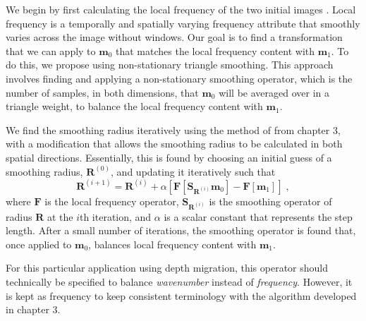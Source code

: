     We begin by first calculating the local frequency of the two initial images \cite[]{attr}. 
    Local frequency is a temporally and spatially varying frequency attribute that smoothly varies across the image without windows.
    Our goal is to find a transformation that we can apply to $\mathbf{m}_0$ that matches the local frequency content with $\mathbf{m}_1$. 
    To do this, we propose using non-stationary triangle smoothing. 
    This approach involves finding and applying a non-stationary smoothing operator, which is the number of samples, in both dimensions, that $\mathbf{m}_0$ will be averaged over in a triangle weight, to balance the local frequency content with $\mathbf{m}_1$. 
    
    We find the smoothing radius iteratively using the method of \cite{locfreq} from chapter 3, with a modification that allows the smoothing radius to be calculated in both spatial directions. 
Essentially, this is found by choosing an initial guess of a smoothing radius, $\mathbf{R}^{(0)}$, and updating it iteratively such that 
    \begin{equation}
        \label{eq:it}
        \mathbf{R}^{(i+1)} = \mathbf{R}^{(i)}+ \alpha \left [ \mathbf{F}[\mathbf{S}_{\mathbf{R}^{(i)}} \mathbf{m}_0] - \mathbf{F}[\mathbf{m}_1] \right ]\;,
    \end{equation}
    where $\mathbf{F}$ is the local frequency operator, $\mathbf{S}_{\mathbf{R}^{(i)}}$ is the smoothing operator of radius $\mathbf{R}$ at the $i$th iteration, and $\alpha$ is a scalar constant that represents the step length.
    After a small number of iterations, the smoothing operator is found that, once applied to $\mathbf{m}_0$, balances local frequency content with $\mathbf{m}_1$.

    For this particular application using depth migration, this operator should technically be specified to balance {\em wavenumber} instead of {\em frequency}.
    However, it is kept as frequency to keep consistent terminology with the algorithm developed in chapter 3.


